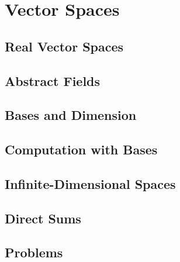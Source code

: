 \chapter{Vector Spaces}
\section{Real Vector Spaces}
\section{Abstract Fields}
\section{Bases and Dimension}
\section{Computation with Bases}
\section{Infinite-Dimensional Spaces}
\section{Direct Sums}
\section{Problems}
